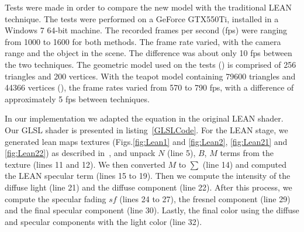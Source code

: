 \documentclass[10pt, conference]{IEEEtran}
\begin{document}
Tests were made in order to compare the new model with the traditional LEAN technique. The tests were performed on a GeForce GTX550Ti, installed in a Windows 7 64-bit machine. The recorded frames per second (fps) were ranging from 1000 to 1600 for both methods. The frame rate varied, with the camera range and the object in the scene. The difference was about only 10 fps between the two techniques. The geometric model used on the tests () is comprised of 256 triangles and 200 vertices. With the teapot model containing 79600 triangles and 44366 vertices (), the frame rates varied from 570 to 790 fps, with a difference of approximately 5 fps between techniques.

In our implementation we adapted the equation in the original LEAN shader. Our GLSL shader is presented in listing~\ref{GLSLCode}. For the LEAN stage, we generated lean maps textures (Figs.\ref{fig:Lean1} and \ref{fig:Lean2}, \ref{fig:Lean21} and \ref{fig:Lean22}) as described in~\cite{Olano:2010:LM:1730804.1730834}, and unpack $N$ (line 5), $B$, $M$ terms from the texture (lines 11 and 12). We then converted $M$ to $∑$ (line 14) and computed the LEAN specular term (lines 15 to 19). Then we compute the intensity of the diffuse light (line 21) and the diffuse component (line 22). After this process, we compute the specular fading $sf$ (lines 24 to 27), the fresnel component (line 29) and the final specular component (line 30). Lastly, the final color using the diffuse and specular components with the light color (line 32).
\end{document}
